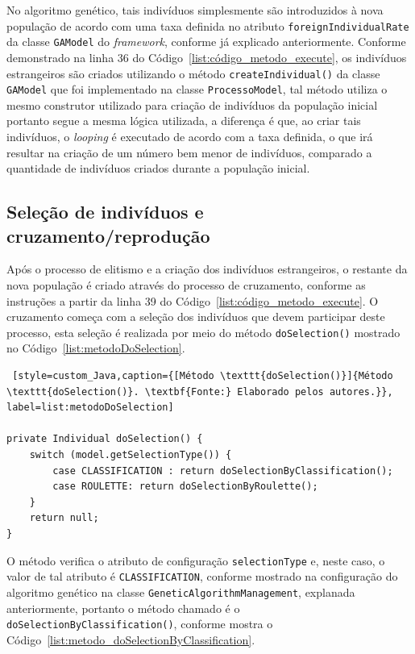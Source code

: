 \par No algoritmo genético, tais indivíduos simplesmente são introduzidos à nova população de acordo com uma taxa definida no 
atributo \texttt{foreignIndividualRate} da classe \texttt{GAModel} do \textit{framework}, conforme já explicado anteriormente. Conforme 
demonstrado na linha 36 do Código~\ref{list:código_metodo_execute}, os indivíduos estrangeiros são criados utilizando o método \texttt{createIndividual()} da classe \texttt{GAModel} que foi implementado na classe \texttt{ProcessoModel}, 
tal método utiliza o mesmo construtor utilizado para criação de indivíduos da população inicial portanto segue a mesma lógica utilizada, a diferença é que, ao criar tais indivíduos, o \textit{looping} é executado de acordo com a taxa definida, o que irá resultar na criação de um número bem menor de indivíduos, comparado a quantidade de indivíduos criados durante a população inicial.

\subsection{Seleção de indivíduos e cruzamento/reprodução}  \label{selecao_cruzamento_section}

\par Após o processo de elitismo e a criação dos indivíduos estrangeiros, o restante da nova população é criado através do processo
de cruzamento, conforme as instruções a partir da linha 39 do Código~\ref{list:código_metodo_execute}. O cruzamento começa com a 
seleção dos indivíduos que devem participar deste processo, esta seleção é realizada por meio do método \texttt{doSelection()} 
mostrado no Código~\ref{list:metodoDoSelection}.

\begin{lstlisting} [style=custom_Java,caption={[Método \texttt{doSelection()}]{Método \texttt{doSelection()}. \textbf{Fonte:} Elaborado pelos autores.}}, label=list:metodoDoSelection] 

private Individual doSelection() {
	switch (model.getSelectionType()) {
		case CLASSIFICATION : return doSelectionByClassification();
		case ROULETTE: return doSelectionByRoulette();
	}
	return null;
}

\end{lstlisting}

\par O método verifica o atributo de configuração \texttt{selectionType} e, neste caso, o valor de tal atributo é 
\texttt{CLASSIFICATION}, conforme mostrado na configuração do algoritmo genético na classe \texttt{GeneticAlgorithmManagement}, 
explanada anteriormente, portanto o método chamado é o \texttt{doSelectionByClassification()}, conforme mostra o Código~\ref{list:metodo_doSelectionByClassification}.

